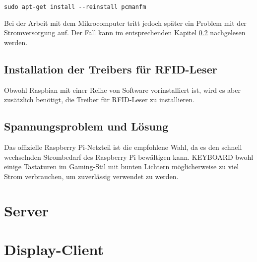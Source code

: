 \begin{lstlisting}
sudo apt-get install --reinstall pcmanfm
\end{lstlisting}
Bei der Arbeit mit dem Mikrocomputer tritt jedoch später ein Problem mit der Stromversorgung auf. Der Fall kann im entsprechenden Kapitel \ref{sec:register_client:voltage_issue} nachgelesen werden.


\subsection{Installation der Treibers für RFID-Leser}
\label{sec:register_client:install_rfid}
Obwohl Raspbian mit einer Reihe von Software vorinstalliert ist, wird es aber zusätzlich benötigt, die Treiber für RFID-Leser zu installieren. 



\subsection{Spannungsproblem und Lösung}
\label{sec:register_client:voltage_issue}
Das offizielle Raspberry Pi-Netzteil ist die empfohlene Wahl, da es den schnell wechselnden Strombedarf des Raspberry Pi bewältigen kann.  KEYBOARD bwohl einige Tastaturen im Gaming-Stil mit bunten Lichtern möglicherweise zu viel Strom verbrauchen, um zuverlässig verwendet zu werden.

\section{Server}
\label{sec:server}


\section{Display-Client}
\label{sec:display_client}
